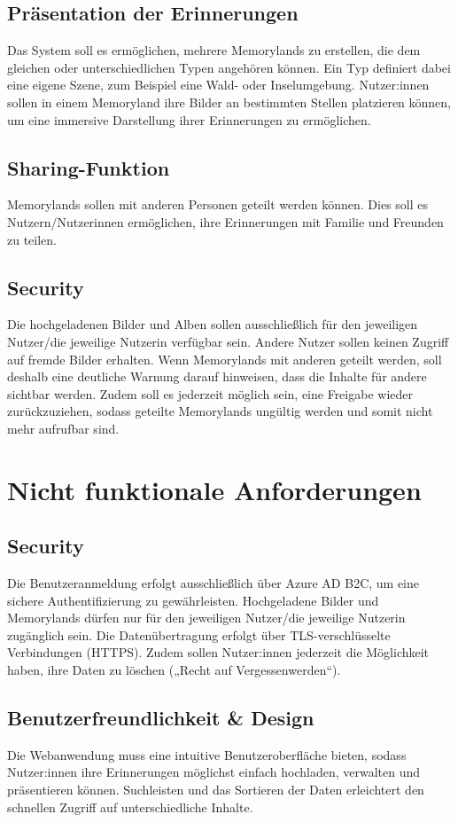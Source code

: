 \subsection{Präsentation der Erinnerungen}

Das System soll es ermöglichen, mehrere Memorylands zu erstellen, die dem 
gleichen oder unterschiedlichen Typen angehören können. Ein Typ definiert 
dabei eine eigene Szene, zum Beispiel eine Wald- oder Inselumgebung. Nutzer:innen sollen
in einem Memoryland ihre Bilder an bestimmten Stellen platzieren können, um 
eine immersive Darstellung ihrer Erinnerungen zu ermöglichen.

\subsection{Sharing-Funktion}

Memorylands sollen mit anderen Personen geteilt werden können. Dies soll es 
Nutzern/Nutzerinnen ermöglichen, ihre Erinnerungen mit Familie und Freunden zu teilen.

\subsection{Security}

Die hochgeladenen Bilder und Alben sollen ausschlie\ss{}lich für den jeweiligen Nutzer/die
jeweilige Nutzerin verfügbar sein. Andere Nutzer sollen keinen Zugriff auf fremde Bilder 
erhalten. Wenn Memorylands mit anderen geteilt werden, soll deshalb eine deutliche Warnung 
darauf hinweisen, dass die Inhalte für andere sichtbar werden. Zudem soll es jederzeit 
möglich sein, eine Freigabe wieder zurückzuziehen, sodass geteilte Memorylands ungültig 
werden und somit nicht mehr aufrufbar sind.

\section{Nicht funktionale Anforderungen}


\subsection{Security}

Die Benutzeranmeldung erfolgt ausschlie\ss{}lich über Azure AD B2C, um eine sichere 
Authentifizierung zu gewährleisten. Hochgeladene Bilder und Memorylands dürfen nur 
für den jeweiligen Nutzer/die jeweilige Nutzerin zugänglich sein. Die Datenübertragung 
erfolgt über TLS-verschlüsselte Verbindungen (HTTPS). Zudem sollen Nutzer:innen jederzeit 
die Möglichkeit haben, ihre Daten zu löschen („Recht auf Vergessenwerden“).

\subsection{Benutzerfreundlichkeit \& Design}

Die Webanwendung muss eine intuitive Benutzeroberfläche bieten, sodass Nutzer:innen ihre 
Erinnerungen möglichst einfach hochladen, verwalten und präsentieren können. 
Suchleisten und das Sortieren der Daten erleichtert den schnellen Zugriff auf 
unterschiedliche Inhalte.
